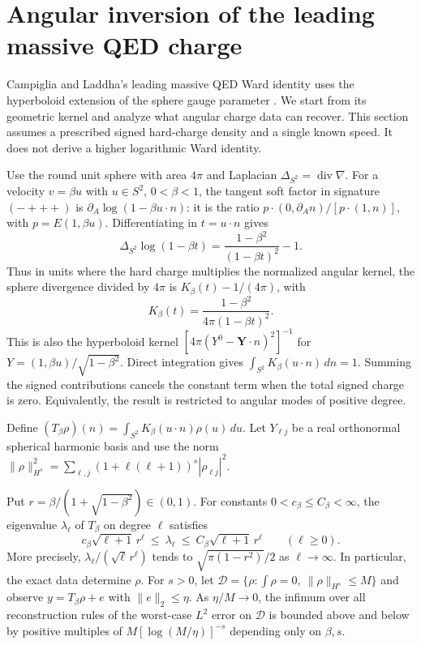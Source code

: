 \section{Angular inversion of the leading massive QED charge}
\label{sec:massive-inverse}

Campiglia and Laddha's leading massive QED Ward identity uses the
hyperboloid extension of the sphere gauge parameter \cite{massive-qed}.
We start from its geometric kernel and analyze what angular charge data
can recover. This section assumes a prescribed signed hard-charge
density and a single known speed. It does not derive a higher
logarithmic Ward identity.

Use the round unit sphere with area $4\pi$ and Laplacian
$\Delta_{S^2}=\operatorname{div}\nabla$. For a velocity $v=\beta u$ with
$u\in S^2$, $0<\beta<1$, the tangent soft factor in signature $(-+++)$
is $\partial_A\log(1-\beta u\cdot n)$: it is the ratio
$p\cdot (0,\partial_A n)/[p\cdot (1,n)]$, with $p=E(1,\beta u)$.
Differentiating in $t=u\cdot n$ gives
\[
 \Delta_{S^2}\log(1-\beta t)
 =\frac{1-\beta^2}{(1-\beta t)^2}-1.
\]
Thus in units where the hard charge multiplies the normalized angular
kernel, the sphere divergence divided by $4\pi$ is
$K_\beta(t)-1/(4\pi)$, with
\[
 K_\beta(t)=\frac{1-\beta^2}{4\pi(1-\beta t)^2}.
\]
This is also the hyperboloid kernel
$[4\pi (Y^0-\mathbf Y\cdot n)^2]^{-1}$ for
$Y=(1,\beta u)/\sqrt{1-\beta^2}$. Direct integration gives
$\int_{S^2} K_\beta(u\cdot n)\,dn=1$. Summing the signed contributions
cancels the constant term when the total signed charge is zero. Equivalently,
the result is restricted to angular modes of positive degree.

Define $(T_\beta\rho)(n)=\int_{S^2}K_\beta(u\cdot n)\rho(u)\,du$.
Let $Y_{\ell j}$ be a real orthonormal spherical harmonic basis and use
the norm $\|\rho\|_{H^s}^2=\sum_{\ell,j}
 (1+\ell(\ell+1))^s|\rho_{\ell j}|^2$.

\begin{theorem}
\label{thm:massive-inverse}
Put $r=\beta/(1+\sqrt{1-\beta^2})\in(0,1)$.
For constants $0<c_\beta\le C_\beta<\infty$, the eigenvalue $\lambda_\ell$
of $T_\beta$ on degree $\ell$ satisfies
\[
 c_\beta\sqrt{\ell+1}\,r^\ell
 \ \le\ \lambda_\ell\ \le\
 C_\beta\sqrt{\ell+1}\,r^\ell\qquad(\ell\ge0).
\]
More precisely, $\lambda_\ell/(\sqrt{\ell}\,r^\ell)$ tends to
$\sqrt{\pi(1-r^2)}/2$ as $\ell\to\infty$.
In particular, the exact data determine $\rho$. For $s>0$, let
$\mathcal D=\{\rho:\int\rho=0,\ \|\rho\|_{H^s}\le M\}$ and observe
$y=T_\beta\rho+e$ with $\|e\|_2\le\eta$. As $\eta/M\to0$, the infimum
over all reconstruction rules of the worst-case $L^2$ error on
$\mathcal D$ is bounded above and below by positive multiples of
$M[\log(M/\eta)]^{-s}$ depending only on $\beta,s$.
\end{theorem}

